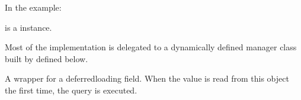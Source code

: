 \documentclass[letterpaper,10pt,french]{sphinxmanual}
\begin{document}
\begin{fulllineitems}
\begin{fulllineitems}
\sphinxAtStartPar
In the example:

\begin{sphinxVerbatim}[commandchars=\\\{\}]
 
       
\end{sphinxVerbatim}

\sphinxAtStartPar
{} is a  instance.

\sphinxAtStartPar
Most of the implementation is delegated to a dynamically defined manager
class built by  defined below.

\end{fulllineitems}


\begin{fulllineitems}
\label{\detokenize{main/model:main.models.Etudiant.contact}}
\pysigstartsignatures
{}
\pysigstopsignatures
\sphinxAtStartPar
A wrapper for a deferred\sphinxhyphen{}loading field. When the value is read from this
object the first time, the query is executed.

\end{fulllineitems}


\begin{fulllineitems}
\label{\detokenize{main/model:main.models.Etudiant.create_compte_etudiant}}
\pysigstartsignatures
{}
\pysigstopsignatures
\end{fulllineitems}


\begin{fulllineitems}
\label{\detokenize{main/model:main.models.Etudiant.credits_obtenus_semestre}}
\pysigstartsignatures
{}
\pysigstopsignatures
\end{fulllineitems}


\end{fulllineitems}
\end{document}
